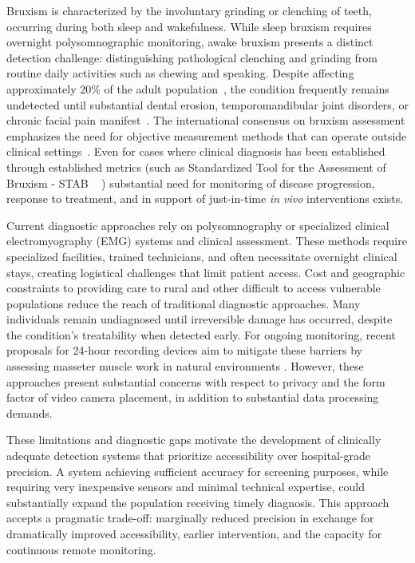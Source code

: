 \documentclass[acmtog, nonacm]{acmart}
\begin{document}
Bruxism is characterized by the involuntary grinding or clenching of teeth, occurring during both sleep and wakefulness. While sleep bruxism requires overnight polysomnographic monitoring, awake bruxism presents a distinct detection challenge: distinguishing pathological clenching and grinding from routine daily activities such as chewing and speaking. Despite affecting approximately 20\% of the adult population~\cite{manfredini2013epidemiology}, the condition frequently remains undetected until substantial dental erosion, temporomandibular joint disorders, or chronic facial pain manifest~\cite{lavigne2008bruxism}. The international consensus on bruxism assessment emphasizes the need for objective measurement methods that can operate outside clinical settings~\cite{lobbezoo2018international}. Even for cases where clinical diagnosis has been established through established metrics (such as Standardized Tool for the Assessment of Bruxism - STAB ~ \cite{manfredini2024standardised})
substantial need for monitoring of disease progression, response to treatment, and in support of just-in-time \textit{in vivo} interventions exists.

Current diagnostic approaches rely on polysomnography or specialized clinical electromyography (EMG) systems and clinical assessment. These methods require specialized facilities, trained technicians, and often necessitate overnight clinical stays, creating logistical challenges that limit patient access.  Cost and geographic constraints to providing care to rural and other difficult to access vulnerable populations reduce the reach of traditional diagnostic approaches. Many individuals remain undiagnosed until irreversible damage has occurred, despite the condition's treatability when detected early. For ongoing monitoring, recent proposals for 24-hour recording devices aim to mitigate these barriers by assessing masseter muscle work in natural environments \cite{colonna2023electromyographic}. However, these approaches present substantial concerns with respect to privacy and the form factor of video camera placement, in addition to substantial data processing demands.

These limitations and diagnostic gaps motivate the development of clinically adequate detection systems that prioritize accessibility over hospital-grade precision. A system achieving sufficient accuracy for screening purposes, while requiring very inexpensive sensors and minimal technical expertise, could substantially expand the population receiving timely diagnosis. This approach accepts a pragmatic trade-off: marginally reduced precision in exchange for dramatically improved accessibility, earlier intervention, and the capacity for continuous remote monitoring.
\end{document}
